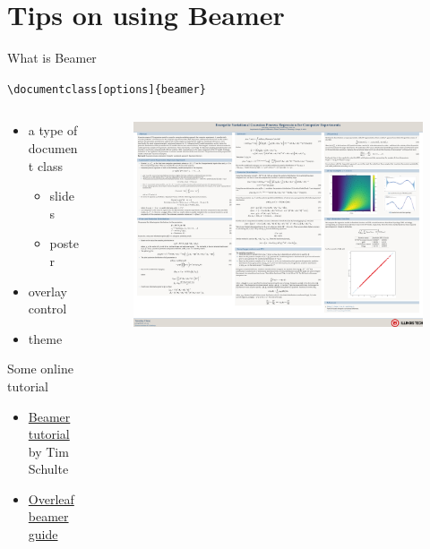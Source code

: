 \documentclass [xcolor=svgnames, t] {beamer}
\begin{document}
\section{Tips on using Beamer}
\begin{frame}[fragile]{What is Beamer}
    \vspace{-1em}
    \begin{center}
        \verb|\documentclass[options]{beamer}|\\
    \end{center}
    \begin{columns}
        \begin{column}{.45\textwidth}
            \vspace*{-1em}
            \begin{itemize}
                \item a type of document class
                \begin{itemize}
                    \item slides
                    \item poster
                \end{itemize}
                \item overlay control
                \item theme
            \end{itemize}
            Some online tutorial
            \begin{itemize}
                \item \href{https://gki.informatik.uni-freiburg.de/teaching/ws1718/prosem/beamer-tutorial17.pdf}{Beamer tutorial} by Tim Schulte
                \item \href{https://www.overleaf.com/learn/latex/Beamer}{Overleaf beamer guide}
            \end{itemize}
            \vspace*{-1em}
        \end{column}
        \begin{column}{.45\textwidth}
            \vspace*{-1em}
            \begin{figure}
                \centering
                \includegraphics[width=\textwidth]{figures/YXPoster.pdf}

\end{figure}
\end{column}
\end{columns}
\end{frame}
\end{document}
